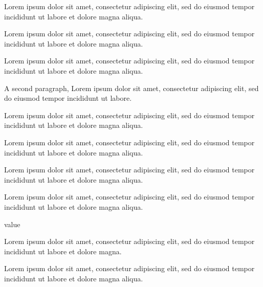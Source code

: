 \documentclass{article}
\begin{document}
Lorem ipsum dolor sit amet, consectetur adipiscing elit, sed do eiusmod tempor incididunt ut labore et dolore magna aliqua.
\begin{description}[leftmargin=2.5cm, style=nextline]
\item[Short] Lorem ipsum dolor sit amet, consectetur adipiscing elit, sed do eiusmod tempor incididunt ut labore et dolore magna aliqua.
\item[A rather long label] Lorem ipsum dolor sit amet, consectetur adipiscing elit, sed do eiusmod tempor incididunt ut labore et dolore magna aliqua.

A second paragraph, Lorem ipsum dolor sit amet, consectetur adipiscing elit, sed do eiusmod tempor incididunt ut labore.
\end{description}
\begin{description}[style=sameline, leftmargin=3cm]
\item[Short] Lorem ipsum dolor sit amet, consectetur adipiscing elit, sed do eiusmod tempor incididunt ut labore et dolore magna aliqua.
\item[A rather long label] Lorem ipsum dolor sit amet, consectetur adipiscing elit, sed do eiusmod tempor incididunt ut labore et dolore magna aliqua.
\end{description}
\begin{description}[style=unboxed]
\item[Unboxed] Lorem ipsum dolor sit amet, consectetur adipiscing elit, sed do eiusmod tempor incididunt ut labore et dolore magna aliqua.
\end{description}
\begin{description}[leftmargin=2cm, labelwidth=1.5cm, align=right, labelsep=0.5cm]
\item[Key] Lorem ipsum dolor sit amet, consectetur adipiscing elit, sed do eiusmod tempor incididunt ut labore et dolore magna aliqua.
\item[Another key] value
\end{description}
\begin{description}[style=nextline, style=standard, leftmargin=2cm]
\item[Standard again] Lorem ipsum dolor sit amet, consectetur adipiscing elit, sed do eiusmod tempor incididunt ut labore et dolore magna.
\end{description}
\begin{description}[leftmargin=*]
\item[Star] Lorem ipsum dolor sit amet, consectetur adipiscing elit, sed do eiusmod tempor incididunt ut labore et dolore magna aliqua.
\end{description}
\end{document}
